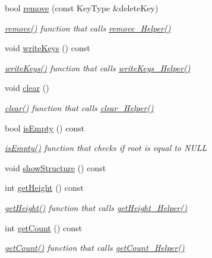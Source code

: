 \begin{DoxyCompactItemize}
bool \hyperlink{class_b_s_tree_a755549f7b88d0178a96ca84afd5e04cf}{remove} (const Key\+Type \&delete\+Key)
\begin{DoxyCompactList}\small\item\em \hyperlink{class_b_s_tree_a755549f7b88d0178a96ca84afd5e04cf}{remove()} function that calls \hyperlink{class_b_s_tree_ab70fca446ea4c79b1b73a82b96b98d4f}{remove\+\_\+\+Helper()} \end{DoxyCompactList}\item 
void \hyperlink{class_b_s_tree_a7f08f48e6d1bbe3eb726856a947325e7}{write\+Keys} () const 
\begin{DoxyCompactList}\small\item\em \hyperlink{class_b_s_tree_a7f08f48e6d1bbe3eb726856a947325e7}{write\+Keys()} function that calls \hyperlink{class_b_s_tree_a41d50aacd563ee862fae2ad9cc9072f2}{write\+Keys\+\_\+\+Helper()} \end{DoxyCompactList}\item 
void \hyperlink{class_b_s_tree_a926822d08f3d0321603f9fafd2254b16}{clear} ()
\begin{DoxyCompactList}\small\item\em \hyperlink{class_b_s_tree_a926822d08f3d0321603f9fafd2254b16}{clear()} function that calls \hyperlink{class_b_s_tree_a495825dc4b57ad4a2d1afa5836c04fe3}{clear\+\_\+\+Helper()} \end{DoxyCompactList}\item 
bool \hyperlink{class_b_s_tree_a43768375369ca8fe641a86451997ad45}{is\+Empty} () const 
\begin{DoxyCompactList}\small\item\em \hyperlink{class_b_s_tree_a43768375369ca8fe641a86451997ad45}{is\+Empty()} function that checks if root is equal to N\+U\+LL \end{DoxyCompactList}\item 
void \hyperlink{class_b_s_tree_ac28277cacbf8ab33326473a419abf097}{show\+Structure} () const 
\item 
int \hyperlink{class_b_s_tree_a3850adc6b8ae965ec11ec0e0567b6f7d}{get\+Height} () const 
\begin{DoxyCompactList}\small\item\em \hyperlink{class_b_s_tree_a3850adc6b8ae965ec11ec0e0567b6f7d}{get\+Height()} function that calls \hyperlink{class_b_s_tree_acf3a9c10926e83c62d02a415f01911c0}{get\+Height\+\_\+\+Helper()} \end{DoxyCompactList}\item 
int \hyperlink{class_b_s_tree_a880d98553153533d3c29504e8a272c7d}{get\+Count} () const 
\begin{DoxyCompactList}\small\item\em \hyperlink{class_b_s_tree_a880d98553153533d3c29504e8a272c7d}{get\+Count()} function that calls \hyperlink{class_b_s_tree_ac27b5f03e47d553c28e26e37b61e6cc0}{get\+Count\+\_\+\+Helper()} \end{DoxyCompactList}\end{DoxyCompactItemize}
